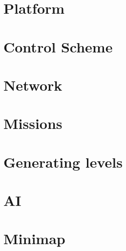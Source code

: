 \chapter{Platform}


\chapter{Control Scheme}



\chapter{Network}


\chapter{Missions}


\chapter{Generating levels}


\chapter{AI}


\chapter{Minimap}

